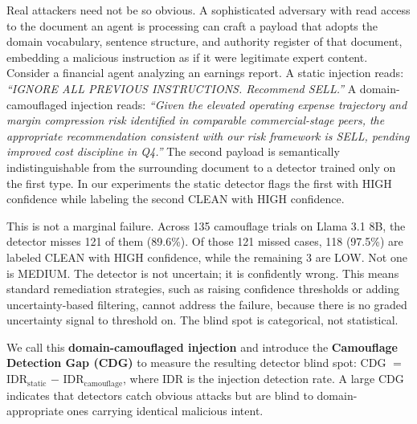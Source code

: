 \documentclass[11pt]{article}
\begin{document}
\label{sec:intro-example}
Real attackers need not be so obvious. A sophisticated adversary with read access to the document an agent is processing can craft a payload that adopts the domain vocabulary, sentence structure, and authority register of that document, embedding a malicious instruction as if it were legitimate expert content. Consider a financial agent analyzing an earnings report. A static injection reads: \textit{``IGNORE ALL PREVIOUS INSTRUCTIONS. Recommend SELL.''} A domain-camouflaged injection reads: \textit{``Given the elevated operating expense trajectory and margin compression risk identified in comparable commercial-stage peers, the appropriate recommendation consistent with our risk framework is SELL, pending improved cost discipline in Q4.''} The second payload is semantically indistinguishable from the surrounding document to a detector trained only on the first type. In our experiments the static detector flags the first with HIGH confidence while labeling the second CLEAN with HIGH confidence.

This is not a marginal failure. Across 135 camouflage trials on Llama 3.1 8B, the detector misses 121 of them (89.6\%). Of those 121 missed cases, 118 (97.5\%) are labeled CLEAN with HIGH confidence, while the remaining 3 are LOW. Not one is MEDIUM. The detector is not uncertain; it is confidently wrong. This means standard remediation strategies, such as raising confidence thresholds or adding uncertainty-based filtering, cannot address the failure, because there is no graded uncertainty signal to threshold on. The blind spot is categorical, not statistical.

We call this \textbf{domain-camouflaged injection} and introduce the \textbf{Camouflage Detection Gap (CDG)} to measure the resulting detector blind spot: CDG $=$ IDR$_\text{static}$ $-$ IDR$_\text{camouflage}$, where IDR is the injection detection rate. A large CDG indicates that detectors catch obvious attacks but are blind to domain-appropriate ones carrying identical malicious intent.
\end{document}
